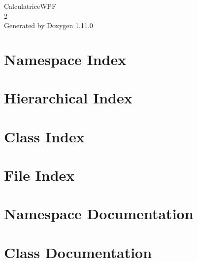 \documentclass[twoside]{book}
\newcommand{\+}{\discretionary{\mbox{\scriptsize$\hookleftarrow$}}{}{}}
\newcommand{\clearemptydoublepage}{%
    \newpage{\pagestyle{empty}\cleardoublepage}%
  }
\begin{document}
  \raggedbottom
    \hypersetup{pageanchor=false,
                bookmarksnumbered=true,
                pdfencoding=unicode
               }
  \begin{titlepage}
  \vspace*{7cm}
  \begin{center}%
  {\Large Calculatrice\+WPF}\\
  [1ex]\large 2 \\
  \vspace*{1cm}
  {\large Generated by Doxygen 1.11.0}\\
  \end{center}
  \end{titlepage}
  \clearemptydoublepage
  \tableofcontents
  \clearemptydoublepage
  \hypersetup{pageanchor=true}
\chapter{Namespace Index}

\chapter{Hierarchical Index}

\chapter{Class Index}

\chapter{File Index}

\chapter{Namespace Documentation}


\chapter{Class Documentation}



\end{document}
